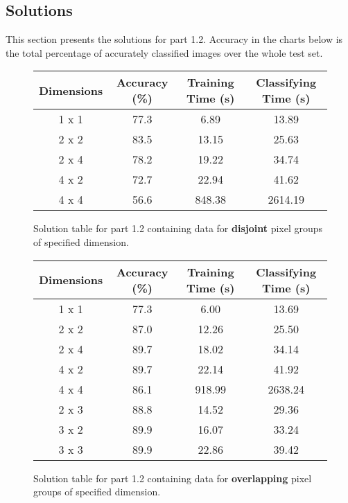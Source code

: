 \documentclass[10pt,a4paper]{article}
\begin{document}
\subsection{Solutions}

This section presents the solutions for part 1.2. Accuracy in the charts below is the total percentage of accurately classified images over the whole test set.

\begin{figure}[H]
\centering
\begin{tabular}{|c|c|c|c|}
\hline
Dimensions & Accuracy (\%) & Training Time (s) & Classifying Time (s) \\
\hline
1 x 1 & 77.3 & 6.89 & 13.89 \\
2 x 2 & 83.5 & 13.15 & 25.63 \\
2 x 4 & 78.2 & 19.22 & 34.74 \\
4 x 2 & 72.7 & 22.94 & 41.62 \\
4 x 4 & 56.6 & 848.38 & 2614.19 \\
\hline
\end{tabular}
\caption{Solution table for part 1.2 containing data for \textbf{disjoint} pixel groups of specified dimension.}
\end{figure}

\begin{figure}[H]
\centering
\begin{tabular}{|c|c|c|c|}
\hline
Dimensions & Accuracy (\%) & Training Time (s) & Classifying Time (s) \\
\hline
1 x 1 & 77.3 & 6.00 & 13.69 \\
2 x 2 & 87.0 & 12.26 & 25.50 \\
2 x 4 & 89.7 & 18.02 & 34.14 \\
4 x 2 & 89.7 & 22.14 & 41.92 \\
4 x 4 & 86.1 & 918.99 & 2638.24 \\
2 x 3 & 88.8 & 14.52 & 29.36 \\
3 x 2 & 89.9 & 16.07 & 33.24  \\
3 x 3 & 89.9 & 22.86 & 39.42 \\
\hline
\end{tabular}
\caption{Solution table for part 1.2 containing data for \textbf{overlapping} pixel groups of specified dimension.}
\end{figure}
\end{document}
